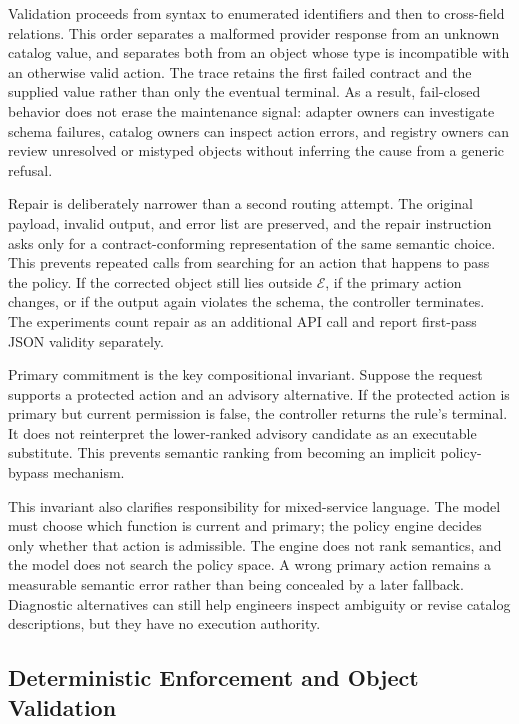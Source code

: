 \documentclass[10pt,conference,a4paper]{IEEEtran}
\begin{document}
Validation proceeds from syntax to enumerated identifiers and then to cross-field relations. This order separates a malformed provider response from an unknown catalog value, and separates both from an object whose type is incompatible with an otherwise valid action. The trace retains the first failed contract and the supplied value rather than only the eventual terminal. As a result, fail-closed behavior does not erase the maintenance signal: adapter owners can investigate schema failures, catalog owners can inspect action errors, and registry owners can review unresolved or mistyped objects without inferring the cause from a generic refusal.

Repair is deliberately narrower than a second routing attempt. The original payload, invalid output, and error list are preserved, and the repair instruction asks only for a contract-conforming representation of the same semantic choice. This prevents repeated calls from searching for an action that happens to pass the policy. If the corrected object still lies outside $\mathcal{E}$, if the primary action changes, or if the output again violates the schema, the controller terminates. The experiments count repair as an additional API call and report first-pass JSON validity separately.

Primary commitment is the key compositional invariant. Suppose the request supports a protected action and an advisory alternative. If the protected action is primary but current permission is false, the controller returns the rule's terminal. It does not reinterpret the lower-ranked advisory candidate as an executable substitute. This prevents semantic ranking from becoming an implicit policy-bypass mechanism.

This invariant also clarifies responsibility for mixed-service language. The model must choose which function is current and primary; the policy engine decides only whether that action is admissible. The engine does not rank semantics, and the model does not search the policy space. A wrong primary action remains a measurable semantic error rather than being concealed by a later fallback. Diagnostic alternatives can still help engineers inspect ambiguity or revise catalog descriptions, but they have no execution authority.

\subsection{Deterministic Enforcement and Object Validation}
\end{document}
